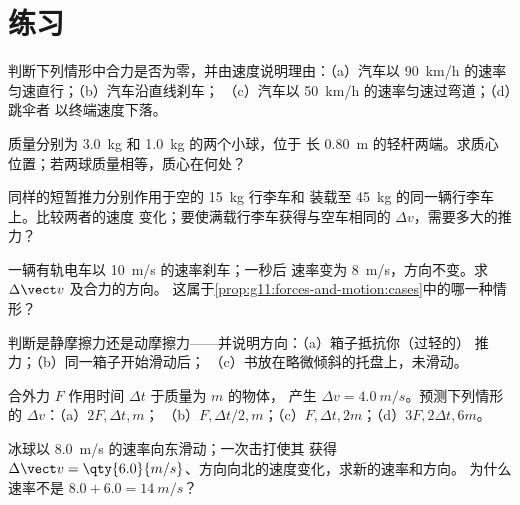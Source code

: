 \section{练习}

\begin{exercise}[$\star$]\label{exo:g11:forces-and-motion:1}
判断下列情形中合力是否为零，并由速度说明理由：（a）汽车以
\qty{90}{km/h} 的速率匀速直行；（b）汽车沿直线刹车；
（c）汽车以 \qty{50}{km/h} 的速率匀速过弯道；（d）跳伞者
以终端速度下落。
\end{exercise}

\begin{exercise}[$\star$]\label{exo:g11:forces-and-motion:2}
质量分别为 \qty{3.0}{kg} 和 \qty{1.0}{kg} 的两个小球，位于
长 \qty{0.80}{m} 的轻杆两端。求质心位置；若两球质量相等，质心在何处？
\end{exercise}

\begin{exercise}[$\star$]\label{exo:g11:forces-and-motion:3}
同样的短暂推力分别作用于空的 \qty{15}{kg} 行李车和
装载至 \qty{45}{kg} 的同一辆行李车上。比较两者的速度
变化；要使满载行李车获得与空车相同的 $\Delta v$，需要多大的推力？
\end{exercise}

\begin{exercise}[$\star$]\label{exo:g11:forces-and-motion:4}
一辆有轨电车以 \qty{10}{m/s} 的速率刹车；一秒后
速率变为 \qty{8}{m/s}，方向不变。求 $\Delta \vect v$ 及合力的方向。
这属于\cref{prop:g11:forces-and-motion:cases}中的哪一种情形？
\end{exercise}

\begin{exercise}[$\star$]\label{exo:g11:forces-and-motion:5}
判断是静摩擦力还是动摩擦力——并说明方向：（a）箱子抵抗你（过轻的）
推力；（b）同一箱子开始滑动后；
（c）书放在略微倾斜的托盘上，未滑动。
\end{exercise}

\begin{exercise}[$\star\star$]\label{exo:g11:forces-and-motion:6}
合外力 $F$ 作用时间 $\Delta t$ 于质量为 $m$ 的物体，
产生 $\Delta v = \qty{4.0}{m/s}$。预测下列情形的 $\Delta v$：（a）$2F, \Delta t, m$；
（b）$F, \Delta t/2, m$；（c）$F, \Delta t, 2m$；（d）$3F, 2\Delta t, 6m$。
\end{exercise}

\begin{exercise}[$\star\star$]\label{exo:g11:forces-and-motion:7}
冰球以 \qty{8.0}{m/s} 的速率向东滑动；一次击打使其
获得 $\Delta \vect v = \qty{6.0}{m/s}$、方向向北的速度变化，求新的速率和方向。
为什么速率不是 $8.0 + 6.0 = \qty{14}{m/s}$？
\end{exercise}


